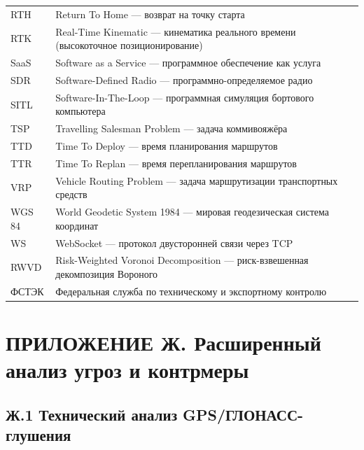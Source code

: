 \documentclass[14pt,a4paper]{extarticle}
\begin{document}
\begin{longtable}[]{@{}
  >{\raggedright\arraybackslash}p{}
  >{\raggedright\arraybackslash}p{}@{}}
RTH & Return To Home --- возврат на точку старта \\
RTK & Real-Time Kinematic --- кинематика реального времени (высокоточное позиционирование) \\
SaaS & Software as a Service --- программное обеспечение как услуга \\
SDR & Software-Defined Radio --- программно-определяемое радио \\
SITL & Software-In-The-Loop --- программная симуляция бортового компьютера \\
TSP & Travelling Salesman Problem --- задача коммивояжёра \\
TTD & Time To Deploy --- время планирования маршрутов \\
TTR & Time To Replan --- время перепланирования маршрутов \\
VRP & Vehicle Routing Problem --- задача маршрутизации транспортных средств \\
WGS 84 & World Geodetic System 1984 --- мировая геодезическая система координат \\
WS & WebSocket --- протокол двусторонней связи через TCP \\
RWVD & Risk-Weighted Voronoi Decomposition --- риск-взвешенная декомпозиция Вороного \\
ФСТЭК & Федеральная служба по техническому и экспортному контролю \\
\end{longtable}


\hypertarget{ux43fux440ux438ux43bux43eux436ux435ux43dux438ux435-ux436.-ux440ux430ux441ux448ux438ux440ux435ux43dux43dux44bux439-ux430ux43dux430ux43bux438ux437-ux443ux433ux440ux43eux437-ux438-ux43aux43eux43dux442ux440ux43cux435ux440ux44b}{%
\section{ПРИЛОЖЕНИЕ Ж. Расширенный анализ угроз и контрмеры}\label{ux43fux440ux438ux43bux43eux436ux435ux43dux438ux435-ux436.-ux440ux430ux441ux448ux438ux440ux435ux43dux43dux44bux439-ux430ux43dux430ux43bux438ux437-ux443ux433ux440ux43eux437-ux438-ux43aux43eux43dux442ux440ux43cux435ux440ux44b}}

\hypertarget{ux436.1-ux442ux435ux445ux43dux438ux447ux435ux441ux43aux438ux439-ux430ux43dux430ux43bux438ux437-gpsux433ux43bux43eux43dux430ux441ux441-ux433ux43bux443ux448ux435ux43dux438ux44f}{%
\subsection{Ж.1 Технический анализ GPS/ГЛОНАСС-глушения}\label{ux436.1-ux442ux435ux445ux43dux438ux447ux435ux441ux43aux438ux439-ux430ux43dux430ux43bux438ux437-gpsux433ux43bux43eux43dux430ux441ux441-ux433ux43bux443ux448ux435ux43dux438ux44f}}
\end{document}
